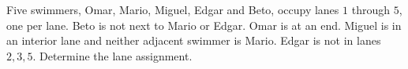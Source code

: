 Five swimmers, Omar, Mario, Miguel, Edgar and Beto, occupy lanes $1$ through $5$, one per lane. Beto is not next to Mario or Edgar. Omar is at an end. Miguel is in an interior lane and neither adjacent swimmer is Mario. Edgar is not in lanes $2,3,5$. Determine the lane assignment.
